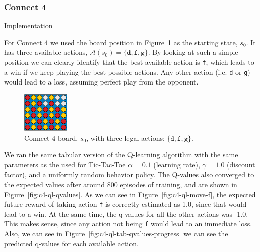 \documentclass{article}
\newcommand{\GithubURL}[2]{
\noindent
\href{https://github.com/davidrobles/mlnd-capstone-code/blob/master/#1}{#2}
\break
}
\begin{document}
\subsubsection{Connect 4}


\GithubURL{examples/c4_ql_tabular_fixed.py}{Implementation}

For Connect 4 we used the board position in \hyperref[fig:c4-ql-tab-cur]
{Figure~\ref*{fig:c4-ql-tab-cur}} as the starting state, $s_0$. It has three available actions,
$\mathcal{A}(s_0) = \{\texttt{d}, \texttt{f}, \texttt{g}\}$. By looking at such a simple position we
can clearly identify that the best available action is \texttt{f}, which leads to a win if we keep
playing the best possible actions.  Any other action (i.e. \texttt{d} or \texttt{g}) would lead to a
loss, assuming perfect play from the opponent.


\begin{figure}[!h]
    \centering
    \includegraphics[width=0.2\textwidth]{figures/c4_ql_tab_current.pdf}
    \caption{Connect 4 board, $s_0$, with three legal actions: $\{\texttt{d}, \texttt{f}, \texttt{g}\}$.}
    \label{fig:c4-ql-tab-cur}
\end{figure}

We ran the same tabular version of the Q-learning algorithm with the same parameters as the used for
Tic-Tac-Toe $\alpha=0.1$ (learning rate), $\gamma=1.0$ (discount factor), and a uniformly random
behavior policy. The Q-values also converged to the expected values after around 800 episodes of
training, and are shown in \hyperref[fig:c4-ql-qvalues] {Figure~\ref*{fig:c4-ql-qvalues}}. As we can
see in \hyperref[fig:c4-ql-move-f] {Figure~\ref*{fig:c4-ql-move-f}}, the expected future reward of
taking action \texttt{f} is correctly estimated as 1.0, since that would lead to a win. At the same
time, the q-values for all the other actions was -1.0. This makes sense, since any action not being
\texttt{f} would lead to an immediate loss. Also, we can see in
\hyperref[fig:c4-ql-tab-qvalues-progress] {Figure~\ref*{fig:c4-ql-tab-qvalues-progress}} we can see
the predicted q-values for each available action. 
\end{document}
